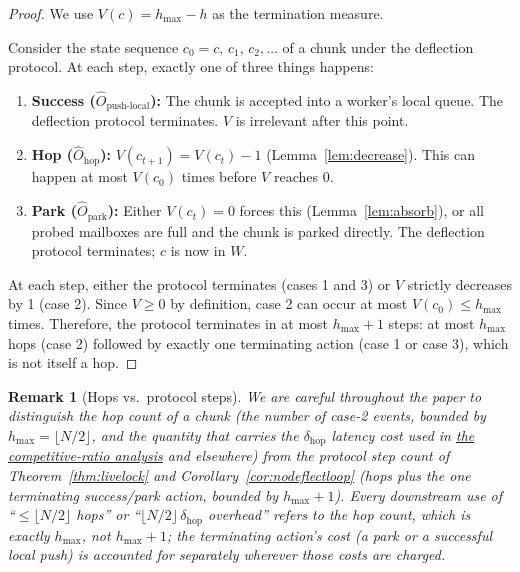 \documentclass[11pt,a4paper]{report}
\newtheorem{remark}{Remark}[section]
\begin{document}
\begin{proof}
We use $V(c) = h_{\max} - h$ as the termination measure.

\medskip
Consider the state sequence $c_0 = c,\, c_1,\, c_2, \ldots$ of a
chunk under the deflection protocol.  At each step, exactly one of
three things happens:

\begin{enumerate}
  \item \textbf{Success ($\hat{O}_{\text{push-local}}$):}
        The chunk is accepted into a worker's local queue.  The
        deflection protocol terminates.  $V$ is irrelevant after
        this point.

  \item \textbf{Hop ($\hat{O}_{\text{hop}}$):}
        $V(c_{t+1}) = V(c_t) - 1$ (Lemma~\ref{lem:decrease}).
        This can happen at most $V(c_0)$ times before $V$ reaches 0.

  \item \textbf{Park ($\hat{O}_{\text{park}}$):}
        Either $V(c_t) = 0$ forces this (Lemma~\ref{lem:absorb}),
        or all probed mailboxes are full and the chunk is parked
        directly.  The deflection protocol terminates; $c$ is now
        in $W$.
\end{enumerate}

At each step, either the protocol terminates (cases 1 and 3) or
$V$ strictly decreases by 1 (case 2).  Since $V \geq 0$ by
definition, case 2 can occur at most $V(c_0) \leq h_{\max}$ times.
Therefore, the protocol terminates in at most $h_{\max} + 1$ steps:
at most $h_{\max}$ hops (case 2) followed by exactly one terminating
action (case 1 or case 3), which is not itself a hop.
\end{proof}

\begin{remark}[Hops vs.\ protocol steps]
\label{rem:hops-vs-steps}
We are careful throughout the paper to distinguish the \emph{hop count}
of a chunk (the number of case-2 events, bounded by $h_{\max} =
\lfloor N/2\rfloor$, and the quantity that carries the
$\delta_{\mathrm{hop}}$ latency cost used in
\hyperref[chap:competitive_ratio]{the competitive-ratio analysis} and
elsewhere) from the \emph{protocol step count} of
Theorem~\ref{thm:livelock} and Corollary~\ref{cor:nodeflectloop} (hops
\emph{plus} the one terminating success/park action, bounded by
$h_{\max}+1$). Every downstream use of ``$\leq \lfloor N/2\rfloor$
hops'' or ``$\lfloor N/2\rfloor\,\delta_{\mathrm{hop}}$ overhead''
refers to the hop count, which is exactly $h_{\max}$, not $h_{\max}+1$;
the terminating action's cost (a park or a successful local push) is
accounted for separately wherever those costs are charged.
\end{remark}
\end{document}
